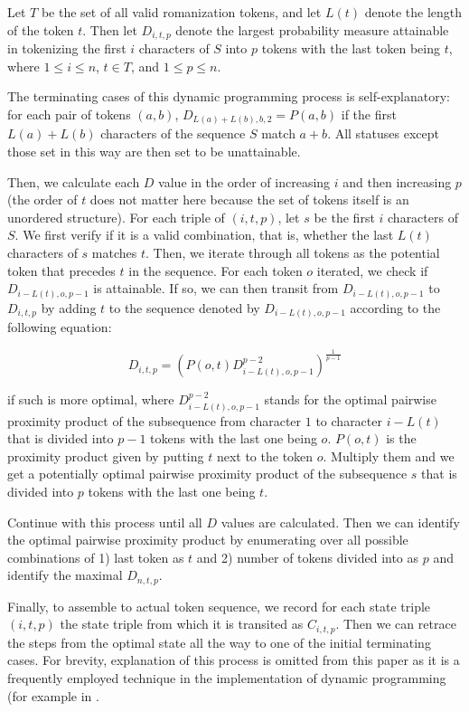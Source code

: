 \documentclass[a4paper,11pt,twocolumn]{article}
\begin{document}
Let $T$ be the set of all valid romanization tokens, and let $L(t)$ denote the length of the token $t$. Then let $D_{i, t, p}$ denote the largest probability measure attainable in tokenizing the first $i$ characters of $S$ into $p$ tokens with the last token being $t$, where $1 \le i \le n$, $t \in T$, and $1 \le p \le n$.

The terminating cases of this dynamic programming process is self-explanatory: for each pair of tokens $(a, b)$, $D_{L(a)+L(b),b,2}=P(a,b)$ if the first $L(a)+L(b)$ characters of the sequence $S$ match $a+b$. All statuses except those set in this way are then set to be unattainable.

Then, we calculate each $D$ value in the order of increasing $i$ and then increasing $p$ (the order of $t$ does not matter here because the set of tokens itself is an unordered structure). For each triple of $(i, t, p)$, let $s$ be the first $i$ characters of $S$. We first verify if it is a valid combination, that is, whether the last $L(t)$ characters of $s$ matches $t$. Then, we iterate through all tokens as the potential token that precedes $t$ in the sequence. For each token $o$ iterated, we check if $D_{i-L(t), o, p-1}$ is attainable. If so, we can then transit from $D_{i-L(t), o, p-1}$ to $D_{i, t, p}$ by adding $t$ to the sequence denoted by $D_{i-L(t), o, p-1}$ according to the following equation:

$$D_{i, t, p} = \left(P(o, t) D_{i-L(t), o, p-1}^{p-2}\right)^{\frac{1}{p-1}}$$

if such is more optimal, where $D_{i-L(t), o, p-1}^{p-2}$ stands for the optimal pairwise proximity product of the subsequence from character $1$ to character $i-L(t)$ that is divided into $p-1$ tokens with the last one being $o$. $P(o, t)$ is the proximity product given by putting $t$ next to the token $o$. Multiply them and we get a potentially optimal pairwise proximity product of the subsequence $s$ that is divided into $p$ tokens with the last one being $t$.

Continue with this process until all $D$ values are calculated. Then we can identify the optimal pairwise proximity product by enumerating over all possible combinations of 1) last token as $t$ and 2) number of tokens divided into as $p$ and identify the maximal $D_{n,t,p}$.

Finally, to assemble to actual token sequence, we record for each state triple $(i, t, p)$ the state triple from which it is transited as $C_{i, t, p}$. Then we can retrace the steps from the optimal state all the way to one of the initial terminating cases. For brevity, explanation of this process is omitted from this paper as it is a frequently employed technique in the implementation of dynamic programming (for example in \cite{doi:10.1137/0110015}.
\end{document}
